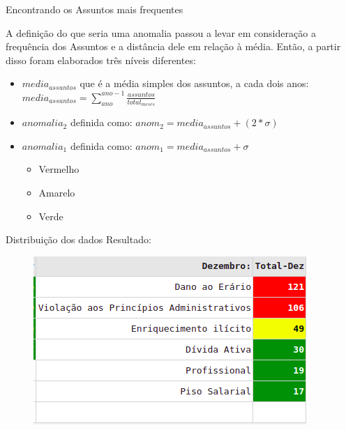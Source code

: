 \documentclass[10pt,t]{beamer}
\begin{document}
\begin{frame}{Encontrando os Assuntos mais frequentes}
	
	A definição do que seria uma anomalia passou a levar em consideração a frequência dos Assuntos e a distância dele em relação à média. Então, a partir disso foram elaborados três níveis diferentes: 
	\begin{itemize}
		
		\item $media_{assuntos}$ que é a média simples dos assuntos, a cada dois anos:
		$media_{assuntos} = \sum\limits_{ano}^{ano-1}\frac{assuntos}{total_{meses}}$
		
		\item $anomalia_2$ definida como: $anom_2 = media_{assuntos} + (2*\sigma)$
		
		\item $anomalia_1$ definida como: $anom_1 = media_{assuntos} + \sigma$
		
		\begin{itemize}
			\item Vermelho \\
			\item Amarelo \\
			\item Verde 
		\end{itemize}
		
		\end{itemize}
\end{frame}

\begin{frame}{Distribuição dos dados}
	\centering
	Resultado:
	\begin{figure}
		\centering
		\includegraphics[scale=0.50]{./imagens/exemplo_final.png}
	\end{figure}
\end{frame}
\end{document}
